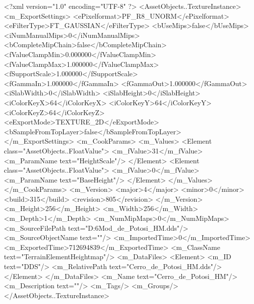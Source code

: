 <?xml version="1.0" encoding="UTF-8" ?>
<AssetObjects..TextureInstance>
	<m_ExportSettings>
		<ePixelformat>PF_R8_UNORM</ePixelformat>
		<eFilterType>FT_GAUSSIAN</eFilterType>
		<bUseMips>false</bUseMips>
		<iNumManualMips>0</iNumManualMips>
		<bCompleteMipChain>false</bCompleteMipChain>
		<fValueClampMin>0.000000</fValueClampMin>
		<fValueClampMax>1.000000</fValueClampMax>
		<fSupportScale>1.000000</fSupportScale>
		<fGammaIn>1.000000</fGammaIn>
		<fGammaOut>1.000000</fGammaOut>
		<iSlabWidth>0</iSlabWidth>
		<iSlabHeight>0</iSlabHeight>
		<iColorKeyX>64</iColorKeyX>
		<iColorKeyY>64</iColorKeyY>
		<iColorKeyZ>64</iColorKeyZ>
		<eExportMode>TEXTURE_2D</eExportMode>
		<bSampleFromTopLayer>false</bSampleFromTopLayer>
	</m_ExportSettings>
	<m_CookParams>
		<m_Values>
			<Element class="AssetObjects..FloatValue">
				<m_fValue>31</m_fValue>
				<m_ParamName text="HeightScale"/>
			</Element>
			<Element class="AssetObjects..FloatValue">
				<m_fValue>0</m_fValue>
				<m_ParamName text="BaseHeight"/>
			</Element>
		</m_Values>
	</m_CookParams>
	<m_Version>
		<major>4</major>
		<minor>0</minor>
		<build>315</build>
		<revision>805</revision>
	</m_Version>
	<m_Height>256</m_Height>
	<m_Width>256</m_Width>
	<m_Depth>1</m_Depth>
	<m_NumMipMaps>0</m_NumMipMaps>
	<m_SourceFilePath text="D:\Civ6Mod\Terrain\NW\CerroDePotosi\Cerro_de_Potosi_HM.dds"/>
	<m_SourceObjectName text=""/>
	<m_ImportedTime>0</m_ImportedTime>
	<m_ExportedTime>712694839</m_ExportedTime>
	<m_ClassName text="TerrainElementHeightmap"/>
	<m_DataFiles>
		<Element>
			<m_ID text="DDS"/>
			<m_RelativePath text="Cerro_de_Potosi_HM.dds"/>
		</Element>
	</m_DataFiles>
	<m_Name text="Cerro_de_Potosi_HM"/>
	<m_Description text=""/>
	<m_Tags/>
	<m_Groups/>
</AssetObjects..TextureInstance>


